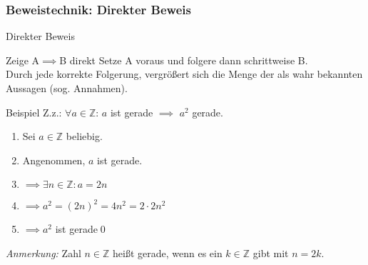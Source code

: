 \subsubsection{Beweistechnik: Direkter Beweis}
\begin{frame}[fragile]{Direkter Beweis}
    \begin{alertblock}{Zeige A$\implies$B direkt}
    Setze A voraus und folgere dann schrittweise B.\\
    Durch jede korrekte Folgerung, vergrößert sich die Menge der als wahr bekannten Aussagen (sog. Annahmen).
    \end{alertblock}
    \begin{exampleblock}{Beispiel}
    Z.z.: \alert<2|handout:0>{$\forall a\in\mathbb{Z}$}: \alert<3|handout:0>{$a$ ist gerade} $\implies$ \alert<6|handout:0>{$a^2$ gerade.}
    \begin{enumerate}
        \item \alert<2|handout:0>{Sei $a\in\mathbb{Z}$ beliebig.}
        \item \alert<3|handout:0>{Angenommen, $a$ ist gerade.}
        \item \alert<4|handout:0>{$\implies \exists n\in\mathbb{Z} : a = 2n$}
        \item \alert<5|handout:0>{$\implies a^2 = (2n)^2 = 4n^2 = 2 \cdot 2n^2$}
        \item \alert<6|handout:0>{$\implies a^2$ ist gerade}\qed\;
    \end{enumerate}
    \end{exampleblock}
    \small{\emph{\alert<4|handout:0>{Anmerkung:}} Zahl $n\in\mathbb{Z}$ heißt gerade, wenn es ein $k\in\mathbb{Z}$ gibt mit $n=2k$.}
\end{frame}

